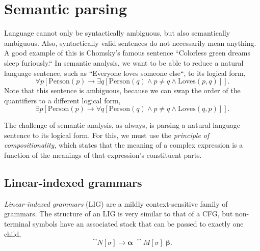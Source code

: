 \section{Semantic parsing} \label{sec:semantic_parsing}

Language cannot only be syntactically ambiguous, but also semantically
ambiguous. Also, syntactically valid sentences do not necessarily mean anything.
A good example of this is Chomsky's famous sentence ``Colorless green dreams
sleep furiously.`` In semantic analysis, we want to be able to reduce a natural
language sentence, such as ``Everyone loves someone else``, to its logical form,
\[
  \forall p [ \mathrm{Person}(p) \to \exists q [ \mathrm{Person}(q) \land p \neq
  q \land \mathrm{Loves}(p, q) ]]
.\]
Note that this sentence is ambiguous, because we can swap the order of the
quantifiers to a different logical form, \[
  \exists p [ \mathrm{Person}(p) \to \forall q [ \mathrm{Person}(q) \land p \neq
  q \land \mathrm{Loves}(q, p) ]]
.\]

The challenge of semantic analysis, as always, is parsing a natural language
sentence to its logical form. For this, we must use the \textit{principle of
compositionality}, which states that the meaning of a complex expression is a
function of the meanings of that expression's constituent parts.

\subsection{Linear-indexed grammars}

\textit{Linear-indexed grammars} (LIG) \citep{aho1968indexed} are a mildly
context-sensitive family of grammars. The structure of an LIG is very similar
to that of a CFG, but non-terminal symbols have an associated stack that can be
passed to exactly one child, \[
  \cat{N}[\sigma] \to \bm{\alpha} \; \cat{M}[\sigma] \; \bm{\beta}
.\]

